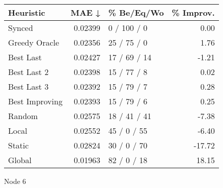 \begin{tabular}{lrlr}
\toprule
\textbf{Heuristic} & \textbf{MAE ↓} & \textbf{\% Be/Eq/Wo} & \textbf{\% Improv.} \\
\midrule
            Synced &        0.02399 &          0 / 100 / 0 &                0.00 \\
     Greedy Oracle &        0.02356 &          25 / 75 / 0 &                1.76 \\
         Best Last &        0.02427 &         17 / 69 / 14 &               -1.21 \\
       Best Last 2 &        0.02398 &          15 / 77 / 8 &                0.02 \\
       Best Last 3 &        0.02392 &          15 / 79 / 7 &                0.28 \\
    Best Improving &        0.02393 &          15 / 79 / 6 &                0.25 \\
            Random &        0.02575 &         18 / 41 / 41 &               -7.38 \\
             Local &        0.02552 &          45 / 0 / 55 &               -6.40 \\
            Static &        0.02824 &          30 / 0 / 70 &              -17.72 \\
            Global &        0.01963 &          82 / 0 / 18 &               18.15 \\
\bottomrule
\end{tabular}
\caption{Node 6}
\label{tab:iid_lr05_le1_bs2_6}
